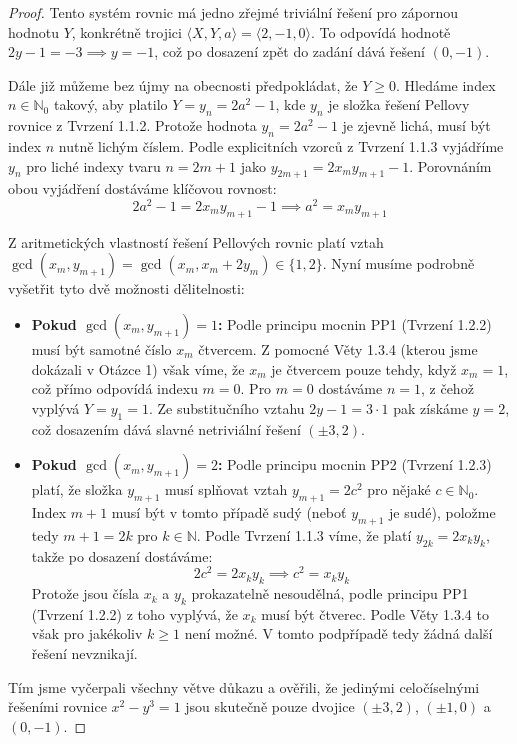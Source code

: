 \documentclass[a4paper,12pt]{article}
\begin{document}
\begin{proof}
Tento systém rovnic má jedno zřejmé triviální řešení pro zápornou hodnotu $Y$, konkrétně trojici $\langle X, Y, a \rangle = \langle 2, -1, 0 \rangle$. To odpovídá hodnotě $2y - 1 = -3 \implies y = -1$, což po dosazení zpět do zadání dává řešení $(0, -1)$.

Dále již můžeme bez újmy na obecnosti předpokládat, že $Y \ge 0$. Hledáme index $n \in \mathbb{N}_0$ takový, aby platilo $Y = y_n = 2a^2 - 1$, kde $y_n$ je složka řešení Pellovy rovnice z Tvrzení 1.1.2. Protože hodnota $y_n = 2a^2 - 1$ je zjevně lichá, musí být index $n$ nutně lichým číslem. Podle explicitních vzorců z Tvrzení 1.1.3 vyjádříme $y_n$ pro liché indexy tvaru $n = 2m + 1$ jako $y_{2m+1} = 2x_m y_{m+1} - 1$. Porovnáním obou vyjádření dostáváme klíčovou rovnost:
$$2a^2 - 1 = 2x_m y_{m+1} - 1 \implies a^2 = x_m y_{m+1}$$ 

Z aritmetických vlastností řešení Pellových rovnic platí vztah $\gcd(x_m, y_{m+1}) = \gcd(x_m, x_m + 2y_m) \in \{1, 2\}$. Nyní musíme podrobně vyšetřit tyto dvě možnosti dělitelnosti:

\begin{itemize}
    \item \textbf{Pokud $\gcd(x_m, y_{m+1}) = 1$:} Podle principu mocnin PP1 (Tvrzení 1.2.2) musí být samotné číslo $x_m$ čtvercem. Z pomocné Věty 1.3.4 (kterou jsme dokázali v Otázce 1) však víme, že $x_m$ je čtvercem pouze tehdy, když $x_m = 1$, což přímo odpovídá indexu $m = 0$. Pro $m = 0$ dostáváme $n = 1$, z čehož vyplývá $Y = y_1 = 1$. Ze substitučního vztahu $2y - 1 = 3 \cdot 1$ pak získáme $y = 2$, což dosazením dává slavné netriviální řešení $(\pm3, 2)$.
    
    \item \textbf{Pokud $\gcd(x_m, y_{m+1}) = 2$:} Podle principu mocnin PP2 (Tvrzení 1.2.3) platí, že složka $y_{m+1}$ musí splňovat vztah $y_{m+1} = 2c^2$ pro nějaké $c \in \mathbb{N}_0$. Index $m+1$ musí být v tomto případě sudý (neboť $y_{m+1}$ je sudé), položme tedy $m+1 = 2k$ pro $k \in \mathbb{N}$. Podle Tvrzení 1.1.3 víme, že platí $y_{2k} = 2x_k y_k$, takže po dosazení dostáváme:
    $$2c^2 = 2x_k y_k \implies c^2 = x_k y_k$$ 
    Protože jsou čísla $x_k$ a $y_k$ prokazatelně nesoudělná, podle principu PP1 (Tvrzení 1.2.2) z toho vyplývá, že $x_k$ musí být čtverec. Podle Věty 1.3.4 to však pro jakékoliv $k \ge 1$ není možné. V tomto podpřípadě tedy žádná další řešení nevznikají.
\end{itemize}

Tím jsme vyčerpali všechny větve důkazu a ověřili, že jedinými celočíselnými řešeními rovnice $x^2 - y^3 = 1$ jsou skutečně pouze dvojice $(\pm3,2)$, $(\pm1,0)$ a $(0,-1)$.
\end{proof}
\end{document}
